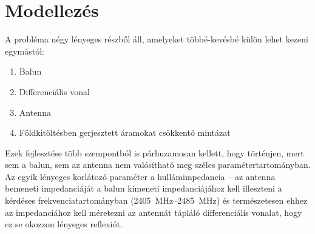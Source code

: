 \chapter{Modellezés}
A probléma négy lényeges részből áll, amelyeket többé-kevésbé külön lehet kezeni egymástól:
\begin{enumerate}
	\item Balun
	\item Differenciális vonal
	\item Antenna
	\item Földkitöltésben gerjesztett áramokat csökkentő mintázat
\end{enumerate}
\par Ezek fejlesztése több szempontból is párhuzamosan kellett, hogy történjen, mert sem a balun, sem az antenna nem valósítható meg széles paramétertartományban. Az egyik lényeges korlátozó paraméter a hullámimpedancia -- az antenna bemeneti impedanciáját a balun kimeneti impedanciájához kell illeszteni a kérdéses frekvenciatartományban (\SIrange{2405}{2485}{MHz}) és természetesen ehhez az impedanciához kell méretezni az antennát tápláló differenciális vonalat, hogy ez se okozzon lényeges reflexiót.
